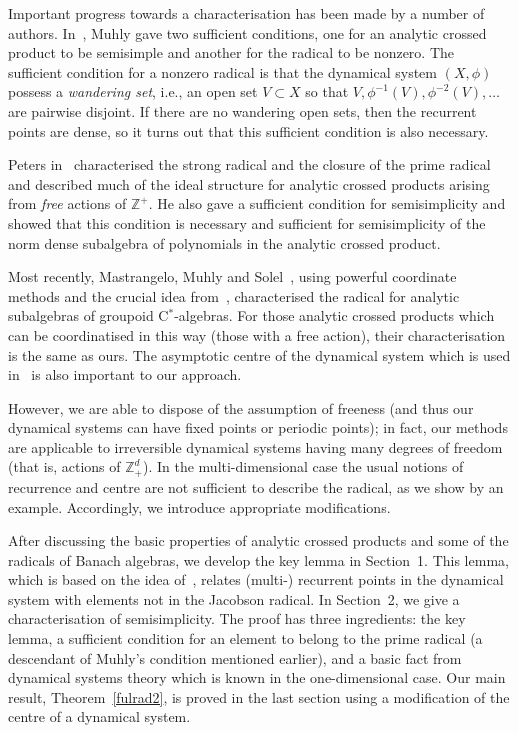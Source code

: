\documentclass[12pt]{amsart}
\theoremstyle{definition}
\newcommand{\bbZ}{\mathbb{Z}}
\newcommand{\cstar}{C$^*$}
\begin{document}
Important progress towards a characterisation has been made by a
number of authors. In~\cite{Muh83}, Muhly gave two sufficient
conditions, one for an analytic crossed product to be semisimple
and another for the radical to be nonzero. The sufficient
condition for a nonzero radical is that the dynamical system
$(X,\phi)$ possess a \textit{wandering set}, i.e., an open set $V
\subset X$ so that $V,\phi^{-1}(V),\phi^{-2}(V),\ldots$ are
pairwise disjoint. If there are no wandering open sets, 
then the recurrent points are dense, so it turns out that this
sufficient condition is also necessary.

Peters in~\cite{Pet84,Pet88a} characterised the strong radical
and the closure of the prime radical
and described much of the
ideal structure for analytic crossed products arising from
\emph{free} actions of $\bbZ^+$. He also gave a sufficient
condition for semisimplicity and showed
that this condition is necessary and sufficient for semisimplicity
of the norm dense subalgebra of polynomials in the analytic
crossed product.

Most recently, Mastrangelo, Muhly and Solel~\cite{MasMuhSol94},
using powerful coordinate methods and the crucial idea
from~\cite{Don93b}, characterised the radical for analytic
subalgebras of groupoid \cstar-algebras. For those analytic
crossed products which can be coordinatised in this way (those
with a free action), their characterisation is the same as ours.
The asymptotic centre of the dynamical system which is used
in~\cite{MasMuhSol94} is also important to our approach.

However, we are able to dispose of the assumption of freeness (and
thus our dynamical systems can have fixed points or periodic
points); in fact, our methods are applicable to irreversible
dynamical systems having many degrees of freedom (that is, actions
of $\bbZ_+^d$). In the multi-dimensional case the usual
notions of recurrence and centre are not sufficient to describe the
radical, as we show by an example. Accordingly, we introduce
appropriate modifications.

After discussing the basic properties of analytic crossed products
and some of the radicals of Banach algebras, we develop the key
lemma in Section~1.
This lemma, which is based on the idea 
of~\cite[Lemma~1]{Don93b}, relates (multi-) recurrent points in the
dynamical system with elements not in the Jacobson radical.
In Section~2, we give a characterisation of semisimplicity.
The proof has three ingredients: the key lemma, a sufficient condition
for an element to belong to the prime radical (a descendant of Muhly's
condition mentioned earlier), and a basic fact from dynamical systems
theory which is known in the one-dimensional case.
Our main result, Theorem~\ref{fulrad2}, is proved in the last section
using a modification of the centre of a dynamical system.
\end{document}
